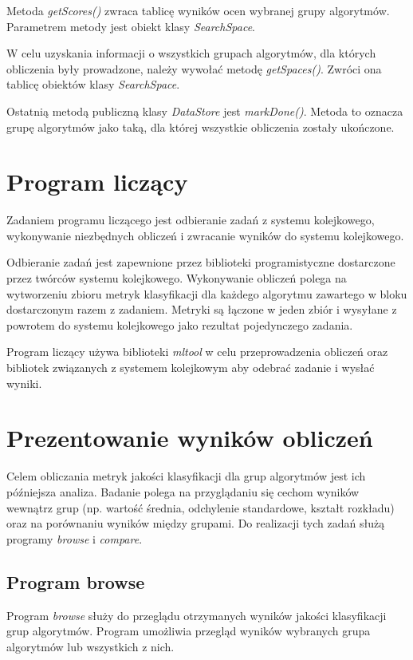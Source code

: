 \documentclass[../thesis.tex]{subfiles}
\begin{document}
Metoda \emph{getScores()} zwraca tablicę wyników ocen wybranej grupy algorytmów. Parametrem metody jest obiekt klasy \emph{SearchSpace}.

W celu uzyskania informacji o wszystkich grupach algorytmów, dla których obliczenia były prowadzone, należy wywołać metodę \emph{getSpaces()}. Zwróci ona tablicę obiektów klasy \emph{SearchSpace}.

Ostatnią metodą publiczną klasy \emph{DataStore} jest \emph{markDone()}. Metoda to oznacza grupę algorytmów jako taką, dla której wszystkie obliczenia zostały ukończone.

\section{Program liczący}

Zadaniem programu liczącego jest odbieranie zadań z systemu kolejkowego, wykonywanie niezbędnych obliczeń i zwracanie wyników do systemu kolejkowego.

Odbieranie zadań jest zapewnione przez biblioteki programistyczne dostarczone przez twórców systemu kolejkowego. Wykonywanie obliczeń polega na wytworzeniu zbioru metryk klasyfikacji dla każdego algorytmu zawartego w bloku dostarczonym razem z zadaniem. Metryki są łączone w jeden zbiór i wysyłane z powrotem do systemu kolejkowego jako rezultat pojedynczego zadania.

Program liczący używa biblioteki \emph{mltool} w celu przeprowadzenia obliczeń oraz bibliotek związanych z systemem kolejkowym aby odebrać zadanie i wysłać wyniki.

\section{Prezentowanie wyników obliczeń}

Celem obliczania metryk jakości klasyfikacji dla grup algorytmów jest ich późniejsza analiza. Badanie polega na przyglądaniu się cechom wyników wewnątrz grup (np. wartość średnia, odchylenie standardowe, kształt rozkładu) oraz na porównaniu wyników między grupami. Do realizacji tych zadań służą programy \emph{browse} i \emph{compare}.

\subsection{Program browse}

Program \emph{browse} służy do przeglądu otrzymanych wyników jakości klasyfikacji grup algorytmów. Program umożliwia przegląd wyników wybranych grupa algorytmów lub wszystkich z nich.
\end{document}
